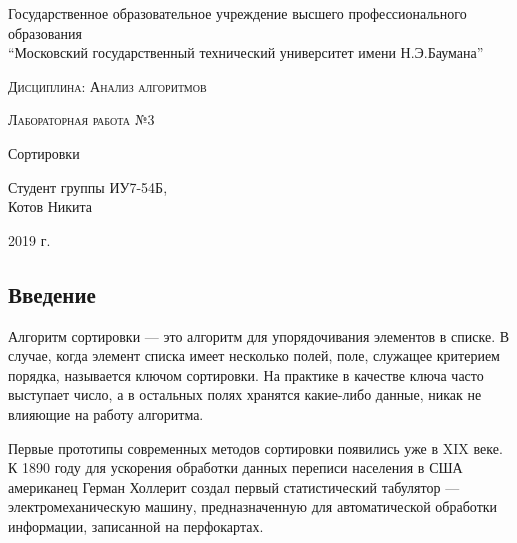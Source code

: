 \documentclass[a4paper,12pt]{article}
\begin{document}
    \begin{titlepage}

        \begin{center}
            \large
            Государственное образовательное учреждение высшего профессионального образования\\
            “Московский государственный технический университет имени Н.Э.Баумана”
            \vspace{3cm}
            
            \textsc{Дисциплина: Анализ алгоритмов}
            \vspace{0.5cm}
                
            \textsc{Лабораторная работа №3}
            \vspace{3cm}
            
            {\LARGE Сортировки}
            \vspace{3cm}
            
            Студент группы ИУ7-54Б,\\   
            Котов Никита
            \vfill
            
            2019 г.
            
            \end{center}
    \end{titlepage}
    
    \begin{center}
    	\tableofcontents
    \end{center}
	
	\setcounter{page}{2}
	\newpage
    \begin{center}
        \section*{Введение}
    \end{center}
        \label{sec:intro}
\qquad Алгоритм сортировки — это алгоритм для упорядочивания элементов в списке. В случае, когда элемент списка имеет несколько полей, поле, служащее критерием порядка, называется ключом сортировки. На практике в качестве ключа часто выступает число, а в остальных полях хранятся какие-либо данные, никак не влияющие на работу алгоритма.   
		
		
		Первые прототипы современных методов сортировки появились уже в XIX веке. К 1890 году для ускорения обработки данных переписи населения в США американец Герман Холлерит создал первый статистический табулятор — электромеханическую машину, предназначенную для автоматической обработки информации, записанной на перфокартах\cite{litlink1}.
		
\end{document}
